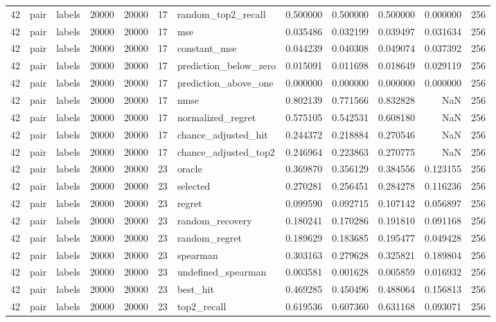 \begin{tabular}{rllrrrlrrrrr}
42 & pair & labels & 20000 & 20000 & 17 & random_top2_recall & 0.500000 & 0.500000 & 0.500000 & 0.000000 & 256 \\
42 & pair & labels & 20000 & 20000 & 17 & mse & 0.035486 & 0.032199 & 0.039497 & 0.031634 & 256 \\
42 & pair & labels & 20000 & 20000 & 17 & constant_mse & 0.044239 & 0.040308 & 0.049074 & 0.037392 & 256 \\
42 & pair & labels & 20000 & 20000 & 17 & prediction_below_zero & 0.015091 & 0.011698 & 0.018649 & 0.029119 & 256 \\
42 & pair & labels & 20000 & 20000 & 17 & prediction_above_one & 0.000000 & 0.000000 & 0.000000 & 0.000000 & 256 \\
42 & pair & labels & 20000 & 20000 & 17 & nmse & 0.802139 & 0.771566 & 0.832828 & NaN & 256 \\
42 & pair & labels & 20000 & 20000 & 17 & normalized_regret & 0.575105 & 0.542531 & 0.608180 & NaN & 256 \\
42 & pair & labels & 20000 & 20000 & 17 & chance_adjusted_hit & 0.244372 & 0.218884 & 0.270546 & NaN & 256 \\
42 & pair & labels & 20000 & 20000 & 17 & chance_adjusted_top2 & 0.246964 & 0.223863 & 0.270775 & NaN & 256 \\
42 & pair & labels & 20000 & 20000 & 23 & oracle & 0.369870 & 0.356129 & 0.384556 & 0.123155 & 256 \\
42 & pair & labels & 20000 & 20000 & 23 & selected & 0.270281 & 0.256451 & 0.284278 & 0.116236 & 256 \\
42 & pair & labels & 20000 & 20000 & 23 & regret & 0.099590 & 0.092715 & 0.107142 & 0.056897 & 256 \\
42 & pair & labels & 20000 & 20000 & 23 & random_recovery & 0.180241 & 0.170286 & 0.191810 & 0.091168 & 256 \\
42 & pair & labels & 20000 & 20000 & 23 & random_regret & 0.189629 & 0.183685 & 0.195477 & 0.049428 & 256 \\
42 & pair & labels & 20000 & 20000 & 23 & spearman & 0.303163 & 0.279628 & 0.325821 & 0.189804 & 256 \\
42 & pair & labels & 20000 & 20000 & 23 & undefined_spearman & 0.003581 & 0.001628 & 0.005859 & 0.016932 & 256 \\
42 & pair & labels & 20000 & 20000 & 23 & best_hit & 0.469285 & 0.450496 & 0.488064 & 0.156813 & 256 \\
42 & pair & labels & 20000 & 20000 & 23 & top2_recall & 0.619536 & 0.607360 & 0.631168 & 0.093071 & 256 \\

\end{tabular}
